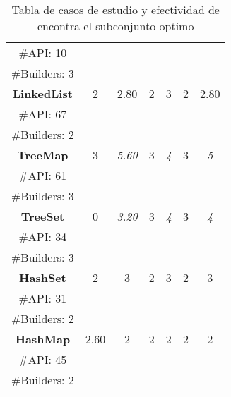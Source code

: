 \begin{table}[H]
\begin{tabular}{|c c|cc|cc|cc|}
\multicolumn{2}{|c|}{\tiny \#API: 10} &  &   & &   & & \\
\multicolumn{2}{|c|}{\tiny \#Builders: 3} &  &   & &   & & \\
\midrule\multicolumn{2}{|c|}{\textbf{LinkedList}} & 2 &  2.80 &  2 &  3 &2  &  2.80  \\
\multicolumn{2}{|c|}{\tiny \#API: 67} &  &   & &   & & \\
\multicolumn{2}{|c|}{\tiny \#Builders: 2} &  &   & &   & & \\
\midrule
\multicolumn{2}{|c|}{\textbf{TreeMap}} &  3 & \cellcolor{gray!25}\emph{5.60}  &  3 &  \cellcolor{gray!25} \emph{4}  &3 & \cellcolor{gray!25}\emph{5}   \\
\multicolumn{2}{|c|}{\tiny \#API: 61} &  &   & &   & & \\
\multicolumn{2}{|c|}{\tiny \#Builders: 3} &  &   & &   & & \\
\midrule
\multicolumn{2}{|c|}{\textbf{TreeSet}} &  0&\cellcolor{gray!25} \emph{3.20}  &  3 &   \cellcolor{gray!25}\emph{4}  & 3 & \cellcolor{gray!25}\emph{4}   \\
\multicolumn{2}{|c|}{\tiny \#API: 34} &  &   & &   & & \\
\multicolumn{2}{|c|}{\tiny \#Builders: 3} &  &   & &   & & \\
\midrule
\multicolumn{2}{|c|}{\textbf{HashSet}} &  2 &3  &  2 &  3& 2  &  3 \\
\multicolumn{2}{|c|}{\tiny \#API: 31} &  &   & &   & & \\
\multicolumn{2}{|c|}{\tiny \#Builders: 2} &  &   & &   & & \\
\midrule
\multicolumn{2}{|c|}{\textbf{HashMap}} & 2.60  & 2  &2   &2   &  2 & 2   \\
\multicolumn{2}{|c|}{\tiny \#API: 45} &  &   & &   & & \\
\multicolumn{2}{|c|}{\tiny \#Builders: 2} &  &   & &   & & \\
\hline
\end{tabular}

\caption{Tabla de casos de estudio y efectividad de encontra el subconjunto optimo}
\label{tab:efectividad}
\end{table}


